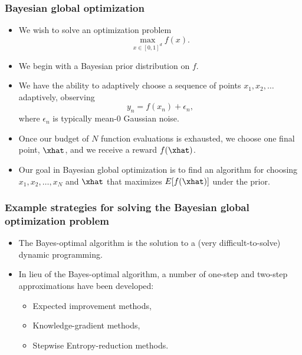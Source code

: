 \begin{frame}
  \frametitle{Bayesian global optimization}
  \begin{itemize}
    \item We wish to solve an optimization problem
      \begin{equation*}
	\max_{x\in[0,1]^d} f(x).
      \end{equation*}
    \item We begin with a Bayesian prior distribution on $f$.
    \item We have the ability to adaptively choose a sequence of points $x_1,x_2,\ldots$ adaptively, observing
      \begin{equation*}
	y_n = f(x_n) + \epsilon_n,
      \end{equation*}
      where $\epsilon_n$ is typically mean-0 Gaussian noise.
    \item Once our budget of $N$ function evaluations is exhausted, we choose one final point, $\xhat$, and we receive a reward $f(\xhat)$.
    \item Our goal in Bayesian global optimization is to find an algorithm for choosing $x_1,x_2,\ldots,x_N$ and $\xhat$ that maximizes $E[f(\xhat)]$ under the prior.
    \end{itemize}
\end{frame}

\begin{frame}
  \frametitle{Example strategies for solving the Bayesian global optimization problem}
  \begin{itemize}
    \item The Bayes-optimal algorithm is the solution to a (very difficult-to-solve) dynamic programming.
    \item In lieu of the Bayes-optimal algorithm, a number of one-step and two-step approximations have been developed:
      \begin{itemize}
	\item Expected improvement methods,
	\item Knowledge-gradient methods,
	\item Stepwise Entropy-reduction methods.
      \end{itemize}
  \end{itemize}
\end{frame}

